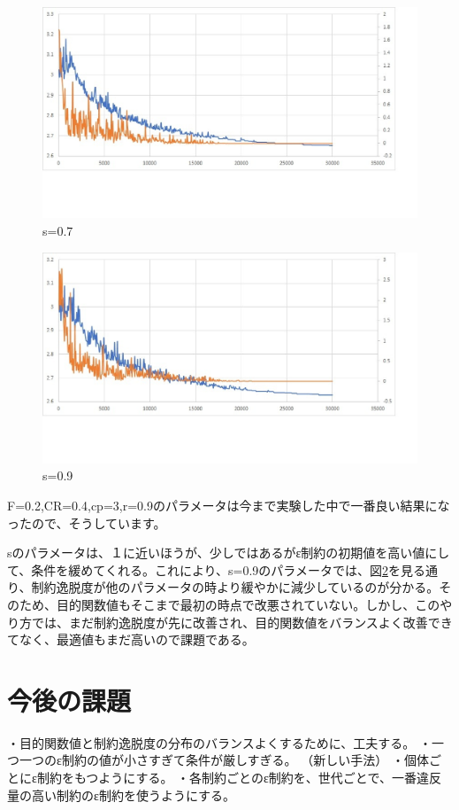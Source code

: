 \documentclass[twocolumn,10pt]{jarticle}
\begin{document}
\begin{figure}[htbp]
  \centering
  \includegraphics[width=.9\linewidth]{fig/s=0.7.eps}
  \caption{s=0.7}
\label{fig:graph6}
\end{figure}
\begin{figure}[htbp]
  \centering
  \includegraphics[width=.9\linewidth]{fig/s=0.9.eps}
  \caption{s=0.9}
\label{fig:graph7}
\end{figure}

F=0.2,CR=0.4,cp=3,r=0.9のパラメータは今まで実験した中で一番良い結果になったので、そうしています。

sのパラメータは、１に近いほうが、少しではあるがε制約の初期値を高い値にして、条件を緩めてくれる。これにより、s=0.9のパラメータでは、図\ref{fig:graph7}を見る通り、制約逸脱度が他のパラメータの時より緩やかに減少しているのが分かる。そのため、目的関数値もそこまで最初の時点で改悪されていない。しかし、このやり方では、まだ制約逸脱度が先に改善され、目的関数値をバランスよく改善できてなく、最適値もまだ高いので課題である。

\section{今後の課題}
・目的関数値と制約逸脱度の分布のバランスよくするために、工夫する。
・一つ一つのε制約の値が小さすぎて条件が厳しすぎる。
（新しい手法）
・個体ごとにε制約をもつようにする。
・各制約ごとのε制約を、世代ごとで、一番違反量の高い制約のε制約を使うようにする。
\end{document}
